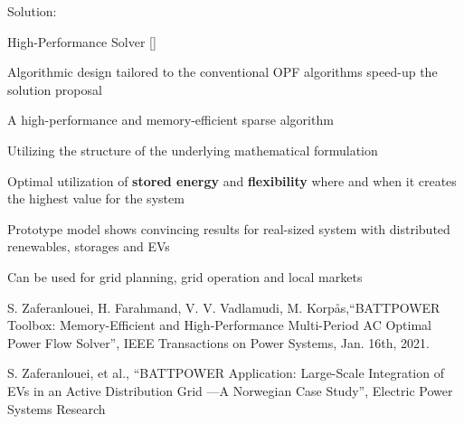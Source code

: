 \documentclass{beamer}
\begin{document}
\begin{frame}{Solution:}
\begin{block}{High-Performance Solver []\ }
\begin{itemize}
{\scriptsize
\item Algorithmic design tailored to the conventional OPF algorithms speed-up the solution proposal
\begin{enumerate}[i.]
{\tiny
\item A high-performance and memory-efficient sparse algorithm 
\item Utilizing the structure of the underlying mathematical formulation}
\end{enumerate}
\item Optimal utilization of \textbf{stored energy} and \textbf{flexibility} where and when it creates the highest value for the system
\item Prototype model shows convincing results for real-sized system with distributed renewables, storages and EVs
\item Can be used for grid planning, grid operation and local markets}
\end{itemize}
\end{block}
\begin{enumerate}
{\tiny 
\item S. Zaferanlouei, H. Farahmand, V. V. Vadlamudi, M. Korpås,“BATTPOWER Toolbox: Memory-Efficient and High-Performance Multi-Period AC Optimal Power Flow Solver”, IEEE Transactions on Power Systems, Jan. 16th, 2021.
\item S. Zaferanlouei, et al., “BATTPOWER Application: Large-Scale Integration of EVs in an Active Distribution Grid ---A Norwegian Case Study”, Electric Power Systems Research}
 \end{enumerate}
\end{frame}

\end{document}
